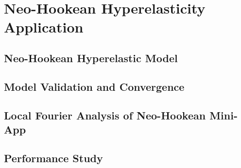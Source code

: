 \chapter{Neo-Hookean Hyperelasticity Application}\label{04-SolidMechanics}


\section{Neo-Hookean Hyperelastic Model}\label{04-01-model}


\section{Model Validation and Convergence}\label{04-02-convergence}


\section{Local Fourier Analysis of Neo-Hookean Mini-App}\label{04-03-localfourieranalysis}


\section{Performance Study}\label{04-04-performance}

